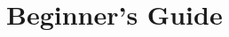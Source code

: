 \documentclass[11pt,a4paper,oneside]{book}
\begin{document}
\pagestyle{empty}



\glsdisablehyper
\glstoctrue
\printglossaries

\cleardoublepage
\printindex


\tableofcontents

\part{Beginner's Guide}

\pagestyle{fancy}














\end{document}
